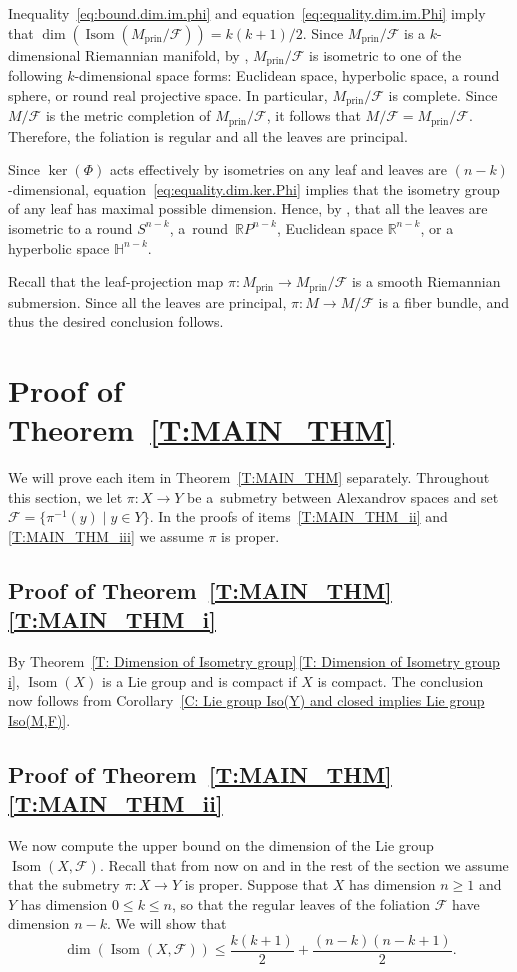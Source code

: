 \documentclass[pdftex]{sigma}
\numberwithin{equation}{section}
\theoremstyle{definition}
\DeclareMathOperator{\Iso}{Isom}
\newcommand{\R}{\mathbb{R}} %
\newcommand{\Sp}{S} %
\newcommand{\RP}{\mathbb{R}P} %
\newcommand{\prin}{\mathrm{prin}}
\newcommand{\fol}{\mathcal{F}}
\newcommand{\p}{\pi}
\begin{document}
Inequality~\eqref{eq:bound.dim.im.phi} and equation~\eqref{eq:equality.dim.im.Phi} imply that
$
\dim(\Iso(M_\prin/\fol)) = k(k+1)/2$.
Since $M_\prin/\fol$ is a $k$-dimensional Riemannian manifold, by \cite[Chapter~II, Theorem 3.1]{Kobayashi}, $M_\prin/\fol$ is isometric to one of the following $k$-dimensional space forms: Euclidean space, hyperbolic space, a round sphere, or round real projective space. In particular, $M_\prin/\fol$ is complete. Since $M/\fol$ is the metric completion of $M_\prin/\fol$, it follows that $M/\fol = M_\prin/\fol$. Therefore, the foliation is regular and all the leaves are principal.

Since $\ker(\Phi)$ acts effectively by isometries on any leaf and leaves are $(n-k)$-dimensional, equation~\eqref{eq:equality.dim.ker.Phi} implies that the isometry group of any leaf has maximal possible dimension. Hence, by \cite[Chapter~II, Theorem~3.1]{Kobayashi}, that all the leaves are isometric to a round $\Sp^{n-k}$, a~round~$\RP^{n-k}$, Euclidean space $\R^{n-k}$, or a hyperbolic space $\mathbb{H}^{n-k}$.

Recall that the leaf-projection map $\pi\colon M_{\prin}\to M_{\prin}/\fol$ is a smooth Riemannian submersion.
Since all the leaves are principal, $\pi\colon M\to M/\fol$ is a fiber bundle, and thus the desired conclusion follows.

\section[Proof of Theorem B]{Proof of Theorem~\ref{T:MAIN_THM}}\label{S:PROOF_MAIN_THM}
	
We will prove each item in Theorem~\ref{T:MAIN_THM} separately. Throughout this section, we let $\pi\colon X\to Y$ be a~submetry between Alexandrov spaces and set $\fol = \big\{\p^{-1}(y)\mid y\in Y\big\}$. In the proofs of items~\ref{T:MAIN_THM_ii} and \ref{T:MAIN_THM_iii} we assume $\pi$ is proper.


\subsection[Proof of Theorem B (i)]{Proof of Theorem~\ref{T:MAIN_THM}\,\ref{T:MAIN_THM_i}}
By Theorem~\ref{T: Dimension of Isometry group}\,\ref{T: Dimension of Isometry group i}, $\Iso(X)$ is a Lie group and is compact if $X$ is compact. The conclusion now follows from Corollary~\ref{C: Lie group Iso(Y) and closed implies Lie group Iso(M,F)}.

\subsection[Proof of Theorem B (ii)]{Proof of Theorem~\ref{T:MAIN_THM}\,\ref{T:MAIN_THM_ii}}
We now compute the upper bound on the dimension of the Lie group $\Iso(X,\fol)$. Recall that from now on and in the rest of the section we assume that the submetry $\pi\colon X\to Y$ is proper.
Suppose that $X$ has dimension $n\geq 1$ and $Y$ has dimension $0\leq k \leq n$, so that the regular leaves of the foliation $\fol$ have dimension $n-k$. We will show that
\[%
 	\dim(\Iso(X,\fol)) \leq \frac{k(k+1)}{2}+\frac{(n-k)(n-k+1)}{2}.
\]
\end{document}
